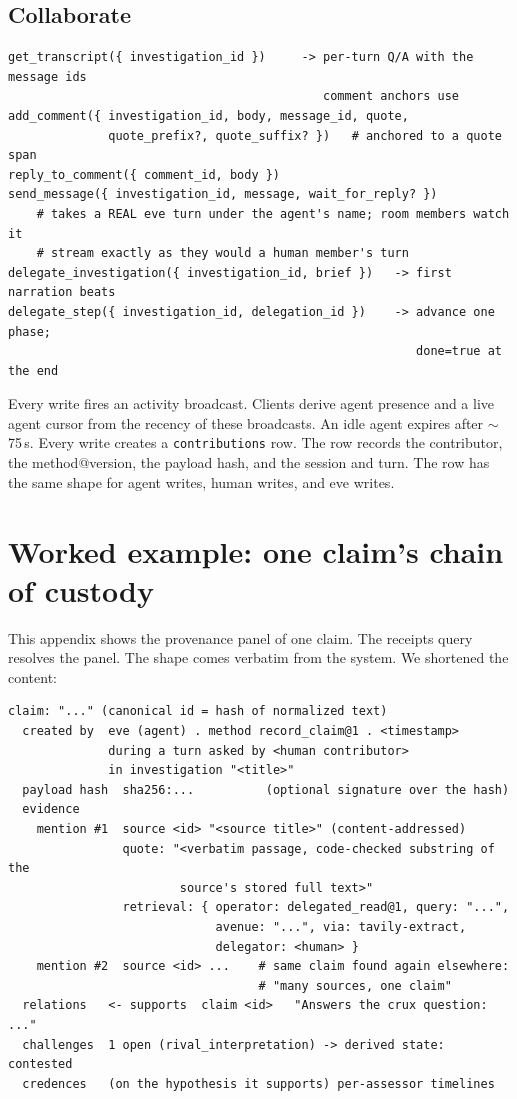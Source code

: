 \documentclass[10pt,twocolumn]{article}
\newcommand{\code}[1]{\texttt{\small #1}}
\begin{document}
\subsection*{Collaborate}
\begin{lstlisting}
get_transcript({ investigation_id })     -> per-turn Q/A with the message ids
                                            comment anchors use
add_comment({ investigation_id, body, message_id, quote,
              quote_prefix?, quote_suffix? })   # anchored to a quote span
reply_to_comment({ comment_id, body })
send_message({ investigation_id, message, wait_for_reply? })
    # takes a REAL eve turn under the agent's name; room members watch it
    # stream exactly as they would a human member's turn
delegate_investigation({ investigation_id, brief })   -> first narration beats
delegate_step({ investigation_id, delegation_id })    -> advance one phase;
                                                         done=true at the end
\end{lstlisting}

Every write fires an activity broadcast. Clients derive agent presence and
a live agent cursor from the recency of these broadcasts. An idle agent
expires after $\sim$75\,s. Every write creates a \code{contributions} row.
The row records the contributor, the method@version, the payload hash, and
the session and turn. The row has the same shape for agent writes, human
writes, and eve writes.

\section{Worked example: one claim's chain of custody}
\label{app:receipt}

This appendix shows the provenance panel of one claim. The receipts query
resolves the panel. The shape comes verbatim from the system. We shortened
the content:

\begin{lstlisting}
claim: "..." (canonical id = hash of normalized text)
  created by  eve (agent) . method record_claim@1 . <timestamp>
              during a turn asked by <human contributor>
              in investigation "<title>"
  payload hash  sha256:...          (optional signature over the hash)
  evidence
    mention #1  source <id> "<source title>" (content-addressed)
                quote: "<verbatim passage, code-checked substring of the
                        source's stored full text>"
                retrieval: { operator: delegated_read@1, query: "...",
                             avenue: "...", via: tavily-extract,
                             delegator: <human> }
    mention #2  source <id> ...    # same claim found again elsewhere:
                                   # "many sources, one claim"
  relations   <- supports  claim <id>   "Answers the crux question: ..."
  challenges  1 open (rival_interpretation) -> derived state: contested
  credences   (on the hypothesis it supports) per-assessor timelines
\end{lstlisting}
\end{document}
